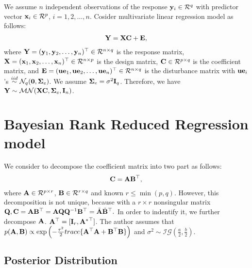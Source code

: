 \documentclass[]{book}
\begin{document}
We assume \(n\) independent observations of the response \({\bf y}_i\in \mathcal{R}^q\) with predictor vector
\({\bf x}_i\in\mathcal{R}^p\), \(i=1,2,\ldots,n\). Cosider multivariate linear regression model as follows:
\begin{eqnarray}
    {\bf Y}={\bf X}{\bf C}+ {\bf E},
    \label{eq:eq1}
    \end{eqnarray}
where \({\bf Y}=({\bf y}_1,{\bf y}_2,\ldots,{\bf y}_n)^{{\top}}\in\mathcal{R}^{n\times q}\) is the response matrix, \({\bf X}=({\bf x}_1,{\bf x}_2,\ldots,{\bf x}_n)^{{\top}}\in\mathcal{R}^{n\times p}\) is the design matrix, \({\bf C}\in\mathcal{R}^{p\times q}\) is the coefficient matrix, and \({\bf E}=({\bf ue}_1,{\bf ue}_2,\ldots,{\bf ue}_n)^{{\top}}\in\mathcal{R}^{n\times q}\) is the disturbance matrix with \({\bf ue}_i\)'s \(\overset{iid}{\sim}\mathcal{N}_q({\bf 0},{\boldsymbol \Sigma}_e)\). We assume \({\boldsymbol \Sigma}_e=\sigma^2{\bf I}_q\). Therefore, we have \({\bf Y}\sim\mathcal{MN}({\bf X}{\bf C},{\boldsymbol \Sigma}_e,{\bf I}_n)\).

\hypertarget{bayesian-rank-reduced-regression-model}{%
\section{Bayesian Rank Reduced Regression model}\label{bayesian-rank-reduced-regression-model}}

We consider to decompose the coefficient matrix into two part as follows:
\begin{eqnarray}
     {\bf C}={\bf A}{\bf B}^{{\top}},
\end{eqnarray}
where \({\bf A}\in\mathcal{R}^{p\times r}\), \({\bf B}\in\mathcal{R}^{r\times q}\) and known \(r\leq \min(p,q)\).
However, this decomposition is not unique, because with a \(r\times r\) nonsingular matrix \({\bf Q}, {\bf C}={\bf A}{\bf B}^{{\top}}={\bf A}{\bf Q}{\bf Q}^{-1}{\bf B}^{{\top}}=\tilde{{\bf A}}\tilde{{\bf B}}^{{\top}}.\)
In order to indentify it, we further decompose \({\bf A}\). \({\bf A}^{{\top}}=[{\bf I}_r, {{\bf A}^*}^{{\top}}]\). The author assumes that \(p({\bf A},{\bf B})\propto\exp\left(-\frac{\tau^2}{2} trace\{ {\bf A}^{{\top}}{\bf A}+{\bf B}^{{\top}}{\bf B}\}\right)\) and \(\sigma^2\sim \mathcal{IG}(\frac{a}{2},\frac{b}{2})\).

\hypertarget{posterior-distribution}{%
\subsection{Posterior Distribution}\label{posterior-distribution}}
\end{document}
